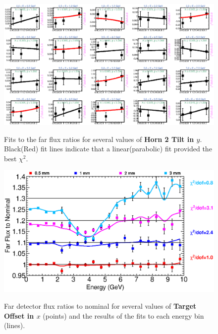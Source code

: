 \begin{figure}[ht]
  \begin{center}
    {\includegraphics[width=5.0in]{figures/Horn2YTilt_far_fits.eps}}
  \end{center}
\caption{ Fits to the far flux ratios for several values of {\bf Horn 2 Tilt in $y$}. Black(Red) fit lines indicate that a linear(parabolic) fit provided the best $\chi^2$. }
\end{figure}

\begin{figure}[ht]
  \begin{center}
    {\includegraphics[width=6.0in]{figures/TargetXOffset_far_summary.eps}}
  \end{center}
\caption{ Far detector flux ratios to nominal for several values of {\bf Target Offset in $x$} (points) and the results of the fits to each energy bin (lines).}
\end{figure}

